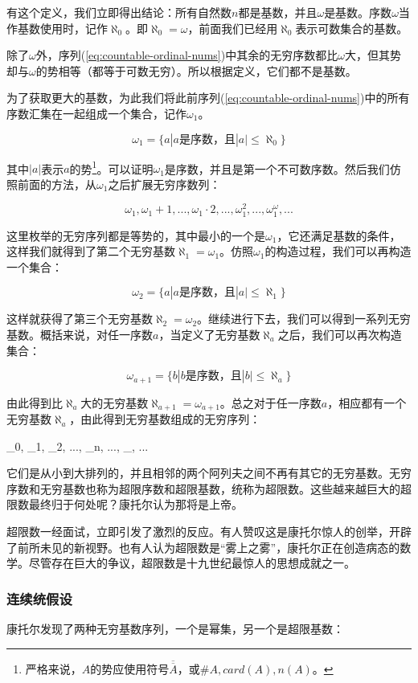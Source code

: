\documentclass{article}
\begin{document}
有这个定义，我们立即得出结论：所有自然数$n$都是基数，并且$\omega$是基数。序数$\omega$当作基数使用时，记作$\aleph_0$。即$\aleph_0 = \omega$，前面我们已经用$\aleph_0$表示可数集合的基数。

除了$\omega$外，序列(\ref{eq:countable-ordinal-nums})中其余的无穷序数都比$\omega$大，但其势却与$\omega$的势相等（都等于可数无穷）。所以根据定义，它们都不是基数。

为了获取更大的基数，为此我们将此前序列(\ref{eq:countable-ordinal-nums})中的所有序数汇集在一起组成一个集合，记作$\omega_1$。

\[
\omega_1 = \{ a | a \text{是序数，且} |a| \leq \aleph_0\}
\]

其中$|a|$表示$a$的势\footnote{严格来说，$A$的势应使用符号$\overline{\overline{A}}$，或$\#A, card(A), n(A)$。}。可以证明$\omega_1$是序数，并且是第一个不可数序数。然后我们仿照前面的方法，从$\omega_1$之后扩展无穷序数列：

\[
\omega_1, \omega_1 + 1, ..., \omega_1 \cdot 2, ..., \omega_1^2, ..., \omega_1^\omega, ...
\]

这里枚举的无穷序列都是等势的，其中最小的一个是$\omega_1$，它还满足基数的条件，这样我们就得到了第二个无穷基数$\aleph_1 = \omega_1$。仿照$\omega_1$的构造过程，我们可以再构造一个集合：

\[
\omega_2 = \{ a | a \text{是序数，且} |a| \leq \aleph_1\}
\]

这样就获得了第三个无穷基数$\aleph_2 = \omega_2$。继续进行下去，我们可以得到一系列无穷基数。概括来说，对任一序数$a$，当定义了无穷基数$\aleph_a$之后，我们可以再次构造集合：

\[
\omega_{a+1} = \{ b | b \text{是序数，且} |b| \leq \aleph_a\}
\]

由此得到比$\aleph_a$大的无穷基数$\aleph_{a+1} = \omega_{a+1}$。总之对于任一序数$a$，相应都有一个无穷基数$\aleph_a$，由此得到无穷基数组成的无穷序列：

\be
\aleph_0, \aleph_1, \aleph_2, ..., \aleph_n, ..., \aleph_{\omega}, ...
\ee

它们是从小到大排列的，并且相邻的两个阿列夫之间不再有其它的无穷基数。无穷序数和无穷基数也称为超限序数和超限基数，统称为超限数。这些越来越巨大的超限数最终归于何处呢？康托尔认为那将是上帝。

超限数一经面试，立即引发了激烈的反应。有人赞叹这是康托尔惊人的创举，开辟了前所未见的新视野。也有人认为超限数是“雾上之雾”，康托尔正在创造病态的数学。尽管存在巨大的争议，超限数是十九世纪最惊人的思想成就之一。

\subsubsection{连续统假设}
  
康托尔发现了两种无穷基数序列，一个是幂集，另一个是超限基数：
\end{document}
